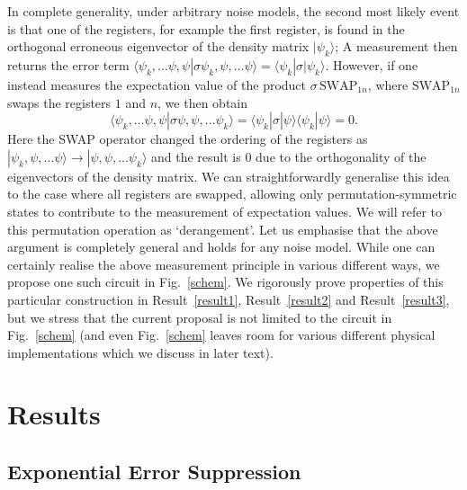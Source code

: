 \documentclass[aps,prx,showpacs,twocolumn,reprint]{revtex4-2}
\begin{document}
In complete generality, under arbitrary noise models, the second most likely event is that one of the registers,
for example the first register,
is found in the orthogonal erroneous eigenvector of the density matrix $| \psi_k \rangle$;
A measurement then returns the error term
$\langle \psi_k, \dots \psi, \psi | \sigma \psi_k, \psi,  \dots \psi \rangle  = \langle\psi_k | \sigma | \psi_k \rangle$.
However, if one instead measures the expectation value of the product $\sigma \, \mathrm{SWAP}_{1n}$, where
$\mathrm{SWAP}_{1n}$ swaps the registers $1$ and $n$, we then obtain
\begin{equation*}
 \langle \psi_k, \dots \psi, \psi | \sigma \psi, \psi,  \dots \psi_k \rangle=
 \langle\psi_k | \sigma | \psi \rangle \langle\psi_k  | \psi \rangle =0.
\end{equation*}
Here the SWAP operator changed the ordering of the registers 
as $ | \psi_k, \psi,  \dots \psi \rangle  \rightarrow | \psi, \psi,  \dots \psi_k \rangle  $ and
the result is $0$
due to the orthogonality of the eigenvectors of the density matrix.
We can straightforwardly generalise this idea to the case where
all registers are swapped, allowing only permutation-symmetric
states to contribute to the measurement of expectation values. We will refer to this
permutation operation as `derangement'. Let us emphasise that the above argument
is completely general and holds for any	noise model.
While one can certainly realise the
above measurement principle in various different ways, we propose one such
circuit in Fig.~\ref{schem}. We rigorously
prove properties of this particular construction in Result~\ref{result1},
Result~\ref{result2} and Result~\ref{result3}, but we stress that the
current proposal is not limited to the circuit in Fig.~\ref{schem}
(and even Fig.~\ref{schem} leaves room for various different physical
implementations which we discuss in later text).




\section{Results}

\subsection{Exponential Error Suppression}
\end{document}
